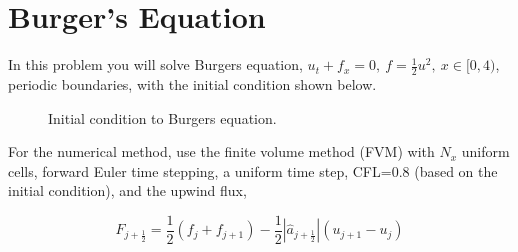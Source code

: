 \section{Burger's Equation}
In this problem you will solve Burgers equation, $u_t+f_x= 0,\ f=\frac{1}{2}u^2,\ x \in [0,4)$, periodic boundaries, with the initial condition shown below.

\begin{figure}[h]
    \centering
    
    \caption{Initial condition to Burgers equation.}
\end{figure}

For the numerical method, use the finite volume method (FVM) with $N_x$ uniform cells, forward Euler time stepping, a uniform time step, CFL=0.8 (based on the initial condition), and the upwind flux,

\begin{equation*}
    \hat{F}_{j + \frac{1}{2}} = \frac{1}{2}\left(f_j + f_{j+1}\right) - \frac{1}{2}|\hat{a}_{j + \frac{1}{2}}|\left(u_{j+1} - u_j\right)
\end{equation*}

